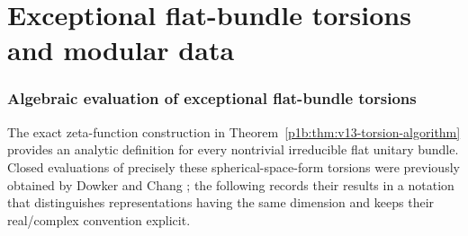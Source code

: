 \documentclass[11pt]{article}
\begin{document}
\part{Exceptional flat-bundle torsions and modular data}
\label{p1b:part:v15-torsion-modular}
\section{Algebraic evaluation of exceptional flat-bundle torsions}
\label{p1b:sec:v15-closed-torsion}
The exact zeta-function construction in Theorem~\ref{p1b:thm:v13-torsion-algorithm}
provides an analytic definition for every nontrivial irreducible flat unitary bundle.
Closed evaluations of precisely these spherical-space-form torsions were previously
obtained by Dowker and Chang \cite{DowkerChang2009AnalyticTorsion}; the following
records their results in a notation that distinguishes representations having
the same dimension and keeps their real/complex convention explicit.
\end{document}
